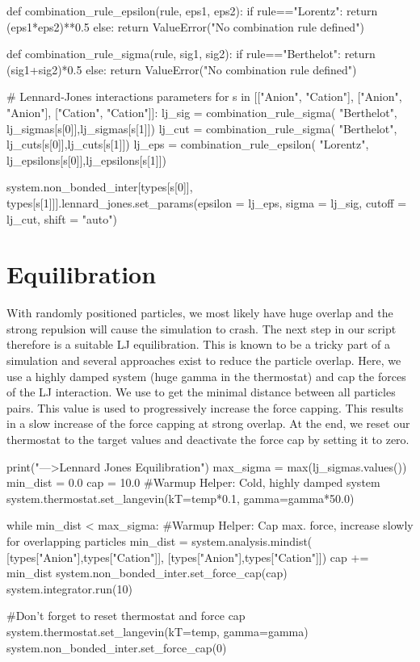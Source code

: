 \documentclass[
a4paper,                        %
11pt,                           %
twoside,                        %
footsepline,                    %
headsepline,                    %
headexclude,                    %
footexclude,                    %
pagesize,                       %
]{scrartcl}
\begin{document}
\begin{pypresso}
def combination_rule_epsilon(rule, eps1, eps2):
    if rule=="Lorentz":
        return (eps1*eps2)**0.5
    else:
        return ValueError("No combination rule defined")

def combination_rule_sigma(rule, sig1, sig2):
    if rule=="Berthelot":
        return (sig1+sig2)*0.5
    else:
        return ValueError("No combination rule defined")

# Lennard-Jones interactions parameters 
for s in [["Anion", "Cation"], 
          ["Anion", "Anion"], 
          ["Cation", "Cation"]]:
        lj_sig = combination_rule_sigma(
                "Berthelot",
                lj_sigmas[s[0]],lj_sigmas[s[1]])
        lj_cut = combination_rule_sigma(
                "Berthelot",
                lj_cuts[s[0]],lj_cuts[s[1]])
        lj_eps = combination_rule_epsilon(
                "Lorentz",
                lj_epsilons[s[0]],lj_epsilons[s[1]])

        system.non_bonded_inter[types[s[0]], types[s[1]]].lennard_jones.set_params(epsilon = lj_eps, sigma = lj_sig, cutoff = lj_cut, shift = "auto")

\end{pypresso}

\section{Equilibration}

With randomly positioned particles, we most likely have huge overlap and the strong repulsion will
cause the simulation to crash. The next step in our script therefore is a suitable LJ equilibration.
This is known to be a tricky part of a simulation and several approaches exist to reduce the particle overlap.
Here, we use a highly damped system (huge gamma in the thermostat) and cap the forces of the LJ interaction.
We use  to get the minimal distance between all particles pairs. This value
is used to progressively increase the force capping. This results in a slow increase of the force capping at
strong overlap. At the end, we reset our thermostat to the target values and deactivate the force cap by setting 
it to zero.

\begin{pypresso}
print("\n--->Lennard Jones Equilibration")
max_sigma = max(lj_sigmas.values())
min_dist = 0.0
cap = 10.0
#Warmup Helper: Cold, highly damped system
system.thermostat.set_langevin(kT=temp*0.1, gamma=gamma*50.0)

while min_dist < max_sigma:
    #Warmup Helper: Cap max. force, increase slowly for overlapping particles
    min_dist = system.analysis.mindist(
            [types["Anion"],types["Cation"]],
            [types["Anion"],types["Cation"]])
    cap += min_dist
    system.non_bonded_inter.set_force_cap(cap)
    system.integrator.run(10)

#Don't forget to reset thermostat and force cap
system.thermostat.set_langevin(kT=temp, gamma=gamma)
system.non_bonded_inter.set_force_cap(0)
\end{pypresso}
\end{document}

